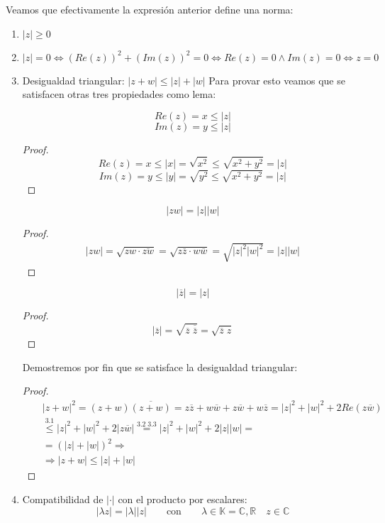 Veamos que efectivamente la expresión anterior define una norma:
\begin{enumerate}
  \item \(|z| \geq 0 \)
  \item \( |z| = 0 \Leftrightarrow (Re(z))^2+(Im(z))^2= 0 \Leftrightarrow Re(z) = 0 \wedge Im(z) = 0 \Leftrightarrow z = 0 \) 
  \item Desigualdad triangular: \( |z+w| \leq |z|+|w| \)
    Para provar esto veamos que se satisfacen otras tres propiedades como lema:
    \begin{lema}[3.1]
      \[ Re(z) = x \leq  |z|\]
      \[ Im(z) = y \leq |z|\]
      \begin{proof}
      \[ Re(z) = x \leq |x| = \sqrt{x^2} \leq \sqrt{x^2+y^2} = |z|\]
      \[ Im(z) = y \leq |y| = \sqrt{y^2} \leq \sqrt{x^2+y^2} = |z|\]
      \end{proof}
    \end{lema}
    \begin{lema}[3.2]
      \[|zw| = |z||w|\]
      \begin{proof}
        \begin{eqnarray*}
          |zw| = \sqrt{zw \cdot \overline{zw}} = \sqrt{z \overline{z} \cdot w \overline{w}} = \sqrt{|z|^2|w|^2} = |z||w|  
        \end{eqnarray*}
      \end{proof}
    \end{lema}
    \begin{lema}[3.3]
      \[|\overline{z}| = |z|\]
      \begin{proof}
        \[|\overline{z}| = \sqrt{\overline{z}\; \overline{\overline{z}}}= \sqrt{\overline{z}\; z} \]
      \end{proof}
    \end{lema}
    Demostremos por fin que se satisface la desigualdad triangular:
    \begin{proof}
      \begin{eqnarray*}
        & & |z+w|^2 = (z+w)\overline{(z+w)} = z\overline{z} + w\overline{w} + z\overline{w} + w\overline{z} = |z|^2+|w|^2+2Re(z\overline{w}) \\
        & &  \overset{3.1}{\leq} |z|^2+|w|^2+2|z\overline{w}| \overset{3.2 \;3.3}{=}|z|^2+|w|^2+2|z||w| = \\
        & & = (|z|+|w|)^2 \Rightarrow \\
        & & \Rightarrow |z+w| \leq |z|+|w|
      \end{eqnarray*}
    \end{proof}
  \item Compatibilidad de \( | \cdot | \) con el producto por escalares:
    \[ |\lambda z | = |\lambda| |z| \qquad \text{con} \qquad \lambda \in \mathbb{K}=\mathbb{C},\mathbb{R} \quad z \in \mathbb{C}\]

\end{enumerate}

